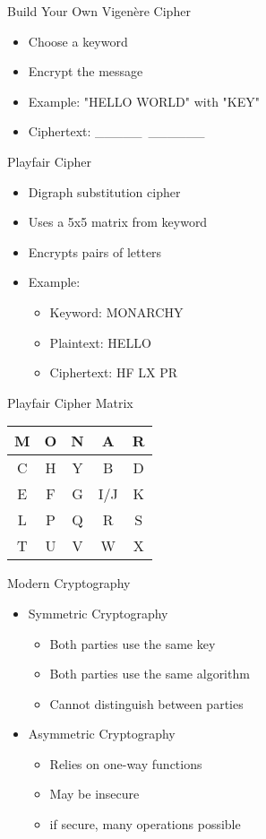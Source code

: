 \begin{withoutheadline}
\begin{frame}{Build Your Own Vigenère Cipher}
\begin{itemize}
    \item Choose a keyword
    \item Encrypt the message
    \item Example: "HELLO WORLD" with "KEY"
    \item Ciphertext: \_\_\_\_\_\ \_\_\_\_\_\_
\end{itemize}
\end{frame}

\begin{frame}{Playfair Cipher}
\begin{itemize}
    \item Digraph substitution cipher
    \item Uses a 5x5 matrix from keyword
    \item Encrypts pairs of letters
    \item Example:
    \begin{itemize}
        \item Keyword: MONARCHY
        \item Plaintext: HELLO
        \item Ciphertext: HF LX PR
    \end{itemize}
\end{itemize}
\end{frame}

\begin{frame}{Playfair Cipher Matrix}
\begin{tabular}{|c|c|c|c|c|}
    \hline
    M & O & N & A & R \\
    \hline
    C & H & Y & B & D \\
    \hline
    E & F & G & I/J & K \\
    \hline
    L & P & Q & R & S \\
    \hline
    T & U & V & W & X \\
    \hline
\end{tabular}
\end{frame}


\begin{frame}{Modern Cryptography}
\begin{itemize}
    \item Symmetric Cryptography
    \begin{itemize}
    \item Both parties use the same key
    \item Both parties use the same algorithm
    \item Cannot distinguish between parties
    \end{itemize}
    \item Asymmetric Cryptography
    \begin{itemize}
    \item Relies on one-way functions
    \item May be insecure
    \item if secure, many operations possible
    \end{itemize}
\end{itemize}
\end{frame}


\end{withoutheadline}
